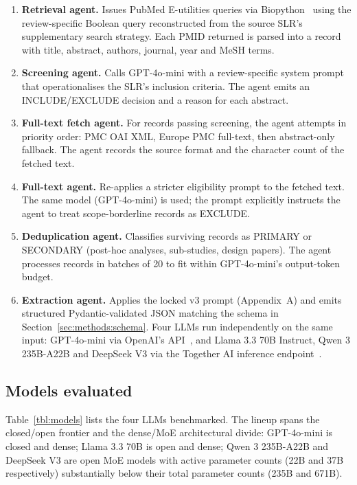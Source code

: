 \documentclass[a4paper,fleqn]{cas-sc}
\begin{document}
\begin{enumerate}
\item \textbf{Retrieval agent.} Issues PubMed E-utilities queries via
Biopython~\citep{cock2009biopython,sayers2022eutilities} using the
review-specific Boolean query reconstructed from the source SLR's
supplementary search strategy. Each PMID returned is parsed into a record
with title, abstract, authors, journal, year and MeSH terms.
\item \textbf{Screening agent.} Calls GPT-4o-mini with a review-specific
system prompt that operationalises the SLR's inclusion criteria. The
agent emits an INCLUDE/EXCLUDE decision and a reason for each abstract.
\item \textbf{Full-text fetch agent.} For records passing screening, the
agent attempts in priority order: PMC OAI XML, Europe PMC full-text, then
abstract-only fallback. The agent records the source format and the
character count of the fetched text.
\item \textbf{Full-text agent.} Re-applies a stricter eligibility prompt
to the fetched text. The same model (GPT-4o-mini) is used; the prompt
explicitly instructs the agent to treat scope-borderline records as
EXCLUDE.
\item \textbf{Deduplication agent.} Classifies surviving records as
PRIMARY or SECONDARY (post-hoc analyses, sub-studies, design papers).
The agent processes records in batches of 20 to fit within
GPT-4o-mini's output-token budget.
\item \textbf{Extraction agent.} Applies the locked v3 prompt
(Appendix~A) and emits structured Pydantic-validated JSON
\citep{pydantic2024} matching the schema in
Section~\ref{sec:methods:schema}. Four LLMs run independently on the
same input: GPT-4o-mini via OpenAI's
API~\citep{openai2024api}, and Llama 3.3 70B Instruct,
Qwen 3 235B-A22B and DeepSeek V3 via the Together AI inference
endpoint~\citep{togetherai2024}.
\end{enumerate}

\subsection{Models evaluated}

Table~\ref{tbl:models} lists the four LLMs benchmarked. The lineup spans
the closed/open frontier and the dense/MoE architectural divide:
GPT-4o-mini is closed and dense; Llama 3.3 70B is open and dense;
Qwen 3 235B-A22B and DeepSeek V3 are open MoE models with active
parameter counts (22B and 37B respectively) substantially below their
total parameter counts (235B and 671B).
\end{document}
